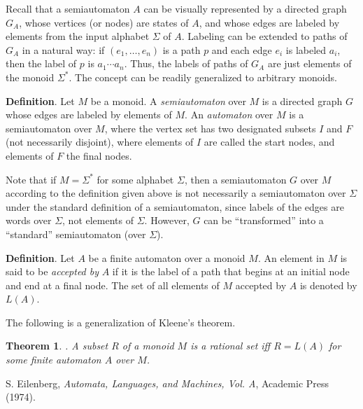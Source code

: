 \documentclass[12pt]{article}
\newtheorem{thm}{Theorem}
\begin{document}
Recall that a semiautomaton $A$ can be visually represented by a directed graph $G_A$, whose vertices (or nodes) are states of $A$, and whose edges are labeled by elements from the input alphabet $\Sigma$ of $A$.  Labeling can be extended to paths of $G_A$ in a natural way: if $(e_1,\ldots, e_n)$ is a path $p$ and each edge $e_i$ is labeled $a_i$, then the label of $p$ is $a_1\cdots a_n$.  Thus, the labels of paths of $G_A$ are just elements of the monoid $\Sigma^*$.  The concept can be readily generalized to arbitrary monoids.

\textbf{Definition}.  Let $M$ be a monoid.  A \emph{semiautomaton} over $M$ is a directed graph $G$ whose edges are labeled by elements of $M$.  An \emph{automaton} over $M$ is a semiautomaton over $M$, where the vertex set has two designated subsets $I$ and $F$ (not necessarily disjoint), where elements of $I$ are called the start nodes, and elements of $F$ the final nodes.

Note that if $M=\Sigma^*$ for some alphabet $\Sigma$, then a semiautomaton $G$ over $M$ according to the definition given above is not necessarily a semiautomaton over $\Sigma$ under the standard definition of a semiautomaton, since labels of the edges are words over $\Sigma$, not elements of $\Sigma$.  However, $G$ can be ``transformed'' into a ``standard'' semiautomaton (over $\Sigma$).

\textbf{Definition}.  Let $A$ be a finite automaton over a monoid $M$.  An element in $M$ is said to be \emph{accepted by} $A$ if it is the label of a path that begins at an initial node and end at a final node.  The set of all elements of $M$ accepted by $A$ is denoted by $L(A)$.

The following is a generalization of Kleene's theorem.

\begin{thm}.  A subset $R$ of a monoid $M$ is a rational set iff $R=L(A)$ for some finite automaton $A$ over $M$. \end{thm}

\begin{thebibliography}{8}
 S. Eilenberg, {\em Automata, Languages, and Machines, Vol. A}, Academic Press (1974).
\end{thebibliography}
\end{document}
